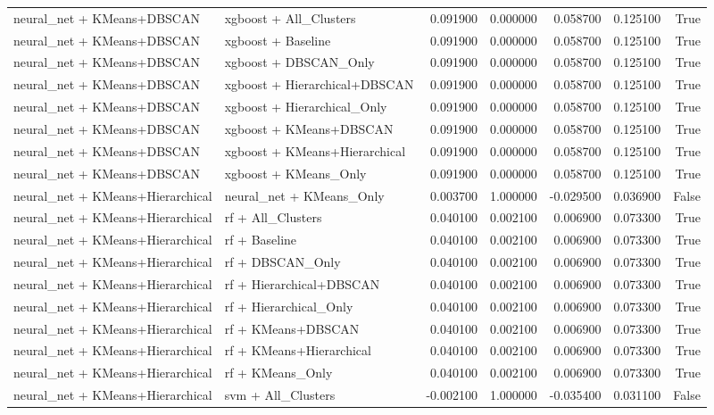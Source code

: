 \begin{tabular}{llrrrrr}
neural_net + KMeans+DBSCAN & xgboost + All_Clusters & 0.091900 & 0.000000 & 0.058700 & 0.125100 & True \\
neural_net + KMeans+DBSCAN & xgboost + Baseline & 0.091900 & 0.000000 & 0.058700 & 0.125100 & True \\
neural_net + KMeans+DBSCAN & xgboost + DBSCAN_Only & 0.091900 & 0.000000 & 0.058700 & 0.125100 & True \\
neural_net + KMeans+DBSCAN & xgboost + Hierarchical+DBSCAN & 0.091900 & 0.000000 & 0.058700 & 0.125100 & True \\
neural_net + KMeans+DBSCAN & xgboost + Hierarchical_Only & 0.091900 & 0.000000 & 0.058700 & 0.125100 & True \\
neural_net + KMeans+DBSCAN & xgboost + KMeans+DBSCAN & 0.091900 & 0.000000 & 0.058700 & 0.125100 & True \\
neural_net + KMeans+DBSCAN & xgboost + KMeans+Hierarchical & 0.091900 & 0.000000 & 0.058700 & 0.125100 & True \\
neural_net + KMeans+DBSCAN & xgboost + KMeans_Only & 0.091900 & 0.000000 & 0.058700 & 0.125100 & True \\
neural_net + KMeans+Hierarchical & neural_net + KMeans_Only & 0.003700 & 1.000000 & -0.029500 & 0.036900 & False \\
neural_net + KMeans+Hierarchical & rf + All_Clusters & 0.040100 & 0.002100 & 0.006900 & 0.073300 & True \\
neural_net + KMeans+Hierarchical & rf + Baseline & 0.040100 & 0.002100 & 0.006900 & 0.073300 & True \\
neural_net + KMeans+Hierarchical & rf + DBSCAN_Only & 0.040100 & 0.002100 & 0.006900 & 0.073300 & True \\
neural_net + KMeans+Hierarchical & rf + Hierarchical+DBSCAN & 0.040100 & 0.002100 & 0.006900 & 0.073300 & True \\
neural_net + KMeans+Hierarchical & rf + Hierarchical_Only & 0.040100 & 0.002100 & 0.006900 & 0.073300 & True \\
neural_net + KMeans+Hierarchical & rf + KMeans+DBSCAN & 0.040100 & 0.002100 & 0.006900 & 0.073300 & True \\
neural_net + KMeans+Hierarchical & rf + KMeans+Hierarchical & 0.040100 & 0.002100 & 0.006900 & 0.073300 & True \\
neural_net + KMeans+Hierarchical & rf + KMeans_Only & 0.040100 & 0.002100 & 0.006900 & 0.073300 & True \\
neural_net + KMeans+Hierarchical & svm + All_Clusters & -0.002100 & 1.000000 & -0.035400 & 0.031100 & False \\

\end{tabular}
